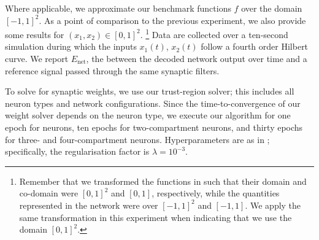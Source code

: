 Where applicable, we approximate our benchmark functions $f$ over the domain $[-1, 1]^2$.
As a point of comparison to the previous experiment, we also provide some results for $(x_1, x_2) \in [0, 1]^2$.%
\footnote{
Remember that we transformed the functions in  such that their domain and co-domain were $[0, 1]^2$ and $[0, 1]$, respectively, while the quantities represented in the network were over $[-1, 1]^2$ and $[-1, 1]$.
We apply the same transformation in this experiment when indicating that we use the domain $[0, 1]^2$.
}
Data are collected over a ten-second simulation during which the inputs $x_1(t)$, $x_2(t)$ follow a fourth order Hilbert curve.
We report $E_\mathrm{net}$, the \NRMSE between the decoded network output over time and a reference signal passed through the same synaptic filters.

To solve for synaptic weights, we use our trust-region \SQP solver; this includes all neuron types and network configurations.
Since the time-to-convergence of our weight solver depends on the neuron type, we execute our algorithm for one epoch for \LIF neurons, ten epochs for two-compartment \LIF neurons, and thirty epochs for three- and four-compartment neurons.
Hyperparameters are as in ; specifically, the regularisation factor is $\lambda = 10^{-3}$.


